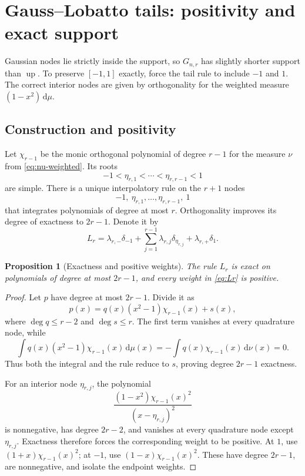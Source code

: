 \documentclass[11pt]{article}
\numberwithin{equation}{section}
\newtheorem{proposition}[theorem]{Proposition}
\theoremstyle{definition}
\theoremstyle{remark}
\newcommand{\Up}{\operatorname{up}}
\newcommand{\dd}{\,\mathrm d}
\begin{document}
\section{Gauss--Lobatto tails: positivity and exact support}
\label{sec:lobatto}

Gaussian nodes lie strictly inside the support, so $G_{n,r}$ has slightly shorter support than $\Up$.  To preserve $[-1,1]$ exactly, force the tail rule to include $-1$ and $1$.  The correct interior nodes are given by orthogonality for the weighted measure $(1-x^2)\dd\mu$.

\subsection{Construction and positivity}

Let $\chi_{r-1}$ be the monic orthogonal polynomial of degree $r-1$ for the measure $\nu$ from \eqref{eq:nu-weighted}.  Its roots
\begin{equation}
 -1<\eta_{r,1}<\cdots<\eta_{r,r-1}<1
 \label{eq:L-interior-nodes}
\end{equation}
are simple.  There is a unique interpolatory rule on the $r+1$ nodes
\begin{equation}
 -1,\ \eta_{r,1},\ldots,\eta_{r,r-1},\ 1
 \label{eq:L-nodes}
\end{equation}
that integrates polynomials of degree at most $r$.  Orthogonality improves its degree of exactness to $2r-1$.  Denote it by
\begin{equation}
 L_r=\lambda_{r,-}\delta_{-1}
 +\sum_{j=1}^{r-1}\lambda_{r,j}\delta_{\eta_{r,j}}
 +\lambda_{r,+}\delta_1.
 \label{eq:Lr}
\end{equation}

\begin{proposition}[Exactness and positive weights]
\label{prop:L-exact-positive}
The rule $L_r$ is exact on polynomials of degree at most $2r-1$, and every weight in \eqref{eq:Lr} is positive.
\end{proposition}

\begin{proof}
Let $p$ have degree at most $2r-1$.  Divide it as
\[
 p(x)=q(x)(x^2-1)\chi_{r-1}(x)+s(x),
 \]
where $\deg q\le r-2$ and $\deg s\le r$.  The first term vanishes at every quadrature node, while
\[
 \int q(x)(x^2-1)\chi_{r-1}(x)\dd\mu(x)
 =-\int q(x)\chi_{r-1}(x)\dd\nu(x)=0.
\]
Thus both the integral and the rule reduce to $s$, proving degree $2r-1$ exactness.

For an interior node $\eta_{r,j}$, the polynomial
\[
 \frac{(1-x^2)\chi_{r-1}(x)^2}{(x-\eta_{r,j})^2}
\]
is nonnegative, has degree $2r-2$, and vanishes at every quadrature node except $\eta_{r,j}$.  Exactness therefore forces the corresponding weight to be positive.  At $1$, use $(1+x)\chi_{r-1}(x)^2$; at $-1$, use $(1-x)\chi_{r-1}(x)^2$.  These have degree $2r-1$, are nonnegative, and isolate the endpoint weights.
\end{proof}
\end{document}
